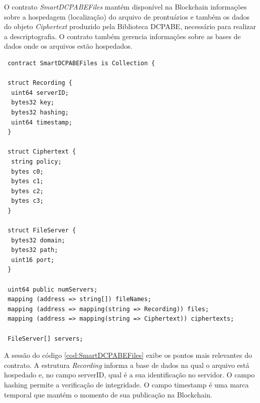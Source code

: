 \documentclass[a4paper,11pt]{article}
\begin{document}


O contrato \emph{SmartDCPABEFiles} mantém disponível na Blockchain informações sobre a hospedagem (localização) do arquivo de prontuários e também os dados do objeto \emph{Ciphertext} produzido pela Biblioteca DCPABE, necessário para realizar a descriptografia. O contrato também gerencia informações sobre as bases de dados onde os arquivos estão hospedados.


\begin{lstlisting}
 contract SmartDCPABEFiles is Collection {

 struct Recording {
  uint64 serverID;
  bytes32 key;
  bytes32 hashing;
  uint64 timestamp;
 }

 struct Ciphertext {
  string policy;
  bytes c0;
  bytes c1;
  bytes c2;
  bytes c3;
 }

 struct FileServer {
  bytes32 domain;
  bytes32 path;
  uint16 port;
 }

 uint64 public numServers;
 mapping (address => string[]) fileNames;
 mapping (address => mapping(string => Recording)) files;
 mapping (address => mapping(string => Ciphertext)) ciphertexts;

 FileServer[] servers;
\end{lstlisting}


A sessão do código \ref{cod:SmartDCPABEFiles} exibe os pontos mais relevantes do contrato.
A estrutura \emph{Recording} informa a base de dados na qual o arquivo está hospedado e, no campo serverID, qual é a sua identificação no servidor.
O campo hashing permite a verificação de integridade. O campo timestamp é uma marca temporal que mantém o momento de sua publicação na Blockchain. %
\end{document}
